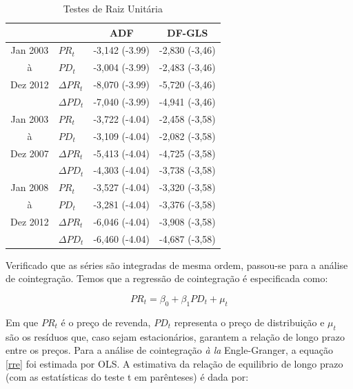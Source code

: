 \documentclass[
	article,			%
	12pt,				%
	openright,			%
	oneside,			%
	a4paper,			%
	english,			%
	brazil				%
	]{abntex2}
\begin{document}
 \begin{table}[htbp]
   \centering
  \caption{Testes de Raiz Unitária}
    \begin{tabular}{c|l|c|c}
 \toprule
                   &       &  \multicolumn{1}{c}{ADF} & \multicolumn{1}{c}{DF-GLS}   \\ \hline \hline
   		Jan 2003	& $PR_{t}$				&  -3,142 (-3.99)	& -2,830 (-3,46)   		\\
         	à			& $PD_{t}$ 			&  -3,004 (-3.99) 	& -2,483 (-3,46)  		\\
         	Dez 2012	& $\Delta PR_{t}$		&  -8,070 (-3.99)  	& -5,720 (-3,46) 	   	\\
  					& $\Delta PD_{t}$		&  -7,040 (-3.99) 	& -4,941 (-3,46)              	\\  \hline
   	  	Jan 2003	& $PR_{t}$				& -3,722 (-4.04)	& -2,458 (-3,58)	   		\\
  		à			& $PD_{t}$ 			& -3,109 (-4.04) 	& -2,082 (-3,58)     	   	\\
  		Dez 2007	& $\Delta PR_{t}$		& -5,413 (-4.04)	& -4,725 (-3,58)    	   	\\
  					& $\Delta PD_{t}$		& -4,303 (-4.04)	& -3,738 (-3,58)  	        \\  \hline       	
		Jan 2008	& $PR_{t}$				& -3,527 (-4.04)	& -3,320 (-3,58)	   	        \\  		
  		à			& $PD_{t}$ 			& -3,281 (-4.04)   	& -3,376 (-3,58)	  	 	\\
		Dez 2012	& $\Delta PR_{t}$		& -6,046 (-4.04)	& -3,908 (-3,58)  	   	\\
					& $\Delta PD_{t}$		& -6,460 (-4.04)   	& -4,687 (-3,58)   	   	\\  \hline          \bottomrule
    \end{tabular}
  \label{raizunitaria}
\end{table}

   
  
Verificado que as séries são integradas de mesma ordem, passou-se para a análise de cointegração. Temos que a regressão de cointegração é especificada como:

\begin{equation} \label{rre}
PR_{t}=\beta_{0}+\beta_{1}PD_{t}+\mu_{t} 
\end{equation}


Em que $PR_{t}$ é o preço de revenda, $PD_{t}$ representa o preço de distribuição e $\mu_{t}$ são os resíduos que, caso sejam estacionários, garantem a relação de longo prazo entre os preços. Para a análise de cointegração \textit{à la} Engle-Granger, a equação \ref{rre} foi estimada por OLS. A estimativa da relação de equilibrio de longo prazo (com as estatísticas do teste t em parênteses) é dada por:
\end{document}
